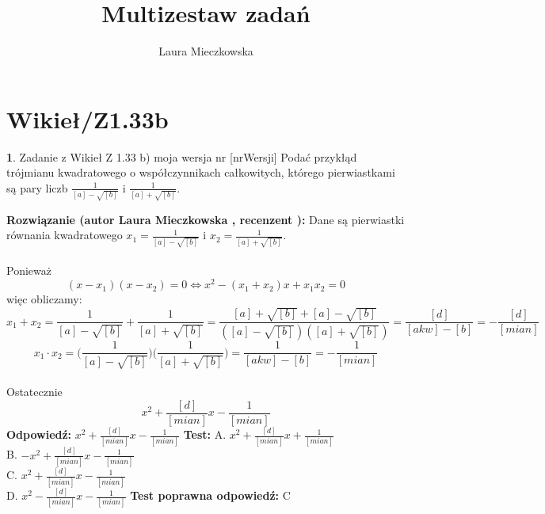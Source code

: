 \documentclass[12pt, a4paper]{article}
\title{Multizestaw zadań}
\author{Laura Mieczkowska}
\date{}
\theoremstyle{definition} %
\newtheorem{zad}{}
\newcommand{\kategoria}[1]{\section{#1}} %
\newcommand{\zadStart}[1]{\begin{zad}#1\newline} %
\newcommand{\zadStop}{\end{zad}}   %
\newcommand{\rozwStart}[2]{\noindent \textbf{Rozwiązanie (autor #1 , recenzent #2): }\newline} %
\newcommand{\odpStart}{\noindent \textbf{Odpowiedź:}\newline}    %
\newcommand{\odpStop}{\newline}                                             %
\newcommand{\testStart}{\noindent \textbf{Test:}\newline} %
\newcommand{\testStop}{\newline} %
\newcommand{\kluczStart}{\noindent \textbf{Test poprawna odpowiedź:}\newline} %
\newcommand{\kluczStop}{\newline} %
\begin{document}
\maketitle


\kategoria{Wikieł/Z1.33b}
\zadStart{Zadanie z Wikieł Z 1.33 b) moja wersja nr [nrWersji]}
Podać przykłąd trójmianu kwadratowego o współczynnikach całkowitych, którego pierwiastkami są pary liczb $\frac{1}{[a]-\sqrt{[b]}}$ i $\frac{1}{[a]+\sqrt{[b]}}$.
\zadStop
\rozwStart{Laura Mieczkowska}{}
Dane są pierwiastki równania kwadratowego $x_1=\frac{1}{[a]-\sqrt{[b]}}$ i $x_2=\frac{1}{[a]+\sqrt{[b]}}$.
\\\\Ponieważ
$$(x-x_1)(x-x_2)=0 \Leftrightarrow x^2-(x_1+x_2)x+x_1x_2=0$$
więc obliczamy:
$$x_1+x_2=\frac{1}{[a]-\sqrt{[b]}}+\frac{1}{[a]+\sqrt{[b]}}=\frac{[a]+\sqrt{[b]}+[a]-\sqrt{[b]}}{([a]-\sqrt{[b]})([a]+\sqrt{[b]})}=\frac{[d]}{[akw]-[b]}=-\frac{[d]}{[mian]}$$
$$x_1\cdot x_2=\bigg(\frac{1}{[a]-\sqrt{[b]}}\bigg)\bigg(\frac{1}{[a]+\sqrt{[b]}}\bigg)=\frac{1}{[akw]-[b]}=-\frac{1}{[mian]}$$
\\Ostatecznie
$$x^2+\frac{[d]}{[mian]}x-\frac{1}{[mian]}$$
\odpStart
$x^2+\frac{[d]}{[mian]}x-\frac{1}{[mian]}$
\odpStop
\testStart
A. $x^2+\frac{[d]}{[mian]}x+\frac{1}{[mian]}$ \\
B. $-x^2+\frac{[d]}{[mian]}x-\frac{1}{[mian]}$ \\
C. $x^2+\frac{[d]}{[mian]}x-\frac{1}{[mian]}$ \\
D. $x^2-\frac{[d]}{[mian]}x-\frac{1}{[mian]}$ 
\testStop
\kluczStart
C
\kluczStop
\end{document}
